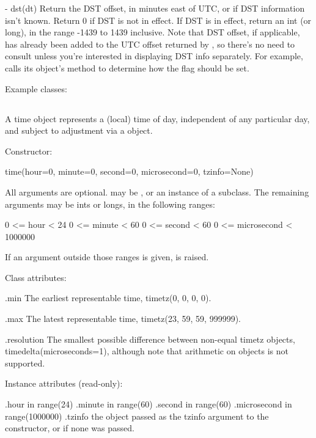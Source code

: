   - dst(dt)
    Return the DST offset, in minutes east of UTC, or  if
    DST information isn't known.  Return 0 if DST is not in effect.
    If DST is in effect, return an int (or long), in the range -1439
    to 1439 inclusive.  Note that DST offset, if applicable, has
    already been added to the UTC offset returned by
    , so there's no need to consult 
    unless you're interested in displaying DST info separately.  For
    example,  calls its 
    object's  method to determine how the
     flag should be set.

Example  classes:




\subsection{ \label{datetime-timetz}}

A time object represents a (local) time of day, independent of any
particular day, and subject to adjustment via a  object.

Constructor:

    time(hour=0, minute=0, second=0, microsecond=0, tzinfo=None)

    All arguments are optional.   may be , or
    an instance of a  subclass.  The remaining arguments
    may be ints or longs, in the following ranges:

        0 <= hour < 24
        0 <= minute < 60
        0 <= second < 60
        0 <= microsecond < 1000000

    If an argument outside those ranges is given,
     is raised.

Class attributes:

    .min
        The earliest representable time, timetz(0, 0, 0, 0).

    .max
        The latest representable time, timetz(23, 59, 59, 999999).

    .resolution
        The smallest possible difference between non-equal timetz
        objects, timedelta(microseconds=1), although note that
        arithmetic on  objects is not supported.

Instance attributes (read-only):

    .hour           in range(24)
    .minute         in range(60)
    .second         in range(60)
    .microsecond    in range(1000000)
    .tzinfo         the object passed as the tzinfo argument to the
                     constructor, or  if none
                    was passed.

